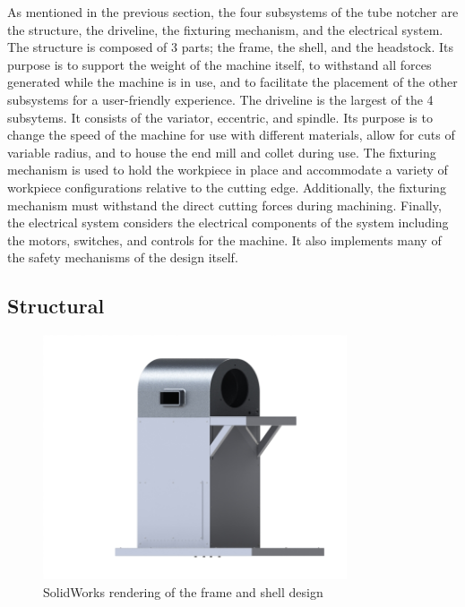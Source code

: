 As mentioned in the previous section, the four subsystems of the tube notcher are the structure, the driveline, the fixturing mechanism, and the electrical system. The structure is composed of 3 parts; the frame, the shell, and the headstock. Its purpose is to support the weight of the machine itself, to withstand all forces generated while the machine is in use, and to facilitate the placement of the other subsystems for a user-friendly experience. The driveline is the largest of the 4 subsytems. It consists of the variator, eccentric, and spindle. Its purpose is to change the speed of the machine for use with different materials, allow for cuts of variable radius, and to house the end mill and collet during use. The fixturing mechanism is used to hold the workpiece in place and accommodate a variety of workpiece configurations relative to the cutting edge. Additionally, the fixturing mechanism must withstand the direct cutting forces during machining. Finally, the electrical system considers the electrical components of the system including the motors, switches, and controls for the machine. It also implements many of the safety mechanisms of the design itself. 

\newpage
\subsection{Structural}

\begin{figure}[H]
    \centering
    \includegraphics[width=0.8\textwidth]{./images/Chapter2-MachineDescription/Structural}
    \caption{SolidWorks rendering of the frame and shell design}
    \label{fig:Frame and Shell}
\end{figure}

